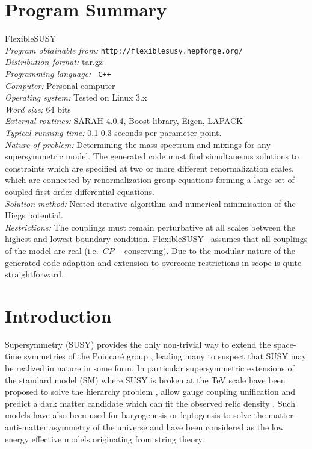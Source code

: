 \documentclass[final,3p,11pt,pdflatex]{elsarticle}
\makeatletter
\newcommand{\fs}{FlexibleSUSY\@\xspace}
\makeatother
\begin{document}
\section{Program Summary}
 \fs\\ {\em Program obtainable from:}
         {\tt http://flexiblesusy.hepforge.org/}\\ {\em Distribution
           format:}\/ tar.gz\\ {\em Programming language:} {\tt
           C++}\\ {\em Computer:}\/ Personal computer\\ {\em Operating
           system:}\/ Tested on Linux 3.x\\ {\em Word size:}\/ 64
         bits\\ {\em External routines:}\/ SARAH 4.0.4, Boost library,
         Eigen, LAPACK\\ {\em
           Typical running time:}\/ 0.1-0.3 seconds per parameter
         point.\\ {\em Nature of problem:}\/ Determining the mass
         spectrum and mixings for any supersymmetric model. The
         generated code must find simultaneous solutions to
         constraints which are specified at two or more different
         renormalization scales, which are connected by
         renormalization group equations forming a large set of
         coupled first-order differential equations. \\ {\em Solution method:}\/
         Nested iterative algorithm and numerical minimisation of the
         Higgs potential.  \\ {\em Restrictions:} The couplings must
         remain perturbative at all scales between the highest and
         lowest boundary condition.  \fs~ assumes that all couplings
         of the model are real (i.e.\ $CP-$conserving). Due to the
         modular nature of the generated code adaption and extension
         to overcome restrictions in scope is quite straightforward.





\newpage
\section{Introduction}
Supersymmetry (SUSY) provides the only non-trivial way to extend the
space-time symmetries of the Poincar\'e
group \cite{Coleman:1967ad,Haag:1974qh}, leading many to suspect that
SUSY may be realized in nature in some form. In particular
supersymmetric extensions of the standard model (SM) where SUSY is broken
at the TeV scale have been proposed to solve the hierarchy
problem \cite{Weinberg:1975gm, Weinberg:1979bn, Gildener:1976ai,
  Susskind:1978ms, 'tHooft:1980xb}, allow gauge coupling
unification \cite{Langacker:1990jh, Ellis:1990wk, Amaldi:1991cn,
  Langacker:1991an, Giunti:1991ta} and predict a dark matter candidate
which can fit the observed relic
density \cite{Goldberg:1983nd,Ellis:1983ew}.  Such models have also
been used for baryogenesis or leptogensis to solve the
matter-anti-matter asymmetry of the universe and have been considered
as the low energy effective models originating from string
theory.
\end{document}
